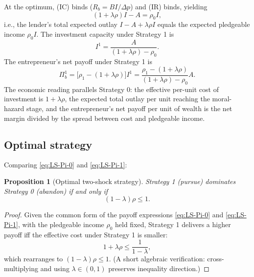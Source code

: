 \documentclass[11pt,a4paper,oneside]{book}
\def\leq{\leqslant}
\theoremstyle{plain}
\newtheorem{proposition}[theorem]{Proposition}
\theoremstyle{definition}
\theoremstyle{remark}
\numberwithin{equation}{chapter}
\begin{document}
At the optimum, (IC) binds ($R_b = BI/\Delta p$) and (IR) binds, yielding
\begin{equation*}
  (1 + \lambda \rho) I - A = \rho_0 I,
\end{equation*}
i.e., the lender's total expected outlay $I - A + \lambda\rho I$ equals the expected pledgeable income $\rho_0 I$.
The investment capacity under Strategy 1 is
\begin{equation}\label{eq:LS-I-1}
  I^1 = \frac{A}{(1+\lambda\rho) - \rho_0}.
\end{equation}
The entrepreneur's net payoff under Strategy 1 is
\begin{equation}\label{eq:LS-Pi-1}
  \Pi_b^1 = \bigl[\rho_1 - (1+\lambda\rho)\bigr] I^1 = \frac{\rho_1 - (1+\lambda\rho)}{(1+\lambda\rho) - \rho_0} A.
\end{equation}
The economic reading parallels Strategy 0: the effective per-unit cost of investment is $1+\lambda\rho$, the expected total outlay per unit reaching the moral-hazard stage, and the entrepreneur's net payoff per unit of wealth is the net margin divided by the spread between cost and pledgeable income.

\subsection{Optimal strategy}

Comparing \eqref{eq:LS-Pi-0} and \eqref{eq:LS-Pi-1}:

\begin{proposition}[Optimal two-shock strategy]\label{prop:LS-strategy}
Strategy 1 (pursue) dominates Strategy 0 (abandon) if and only if
\begin{equation}\label{eq:LS-policy}
  (1-\lambda) \rho \leq 1.
\end{equation}
\end{proposition}

\begin{proof}
Given the common form of the payoff expressions \eqref{eq:LS-Pi-0} and \eqref{eq:LS-Pi-1}, with the pledgeable income $\rho_0$ held fixed, Strategy 1 delivers a higher payoff iff the effective cost under Strategy 1 is smaller:
\begin{equation*}
  1 + \lambda \rho \leq \frac{1}{1-\lambda},
\end{equation*}
which rearranges to $(1-\lambda)\rho \leq 1$.
(A short algebraic verification: cross-multiplying and using $\lambda \in (0,1)$ preserves inequality direction.)
\end{proof}
\end{document}
